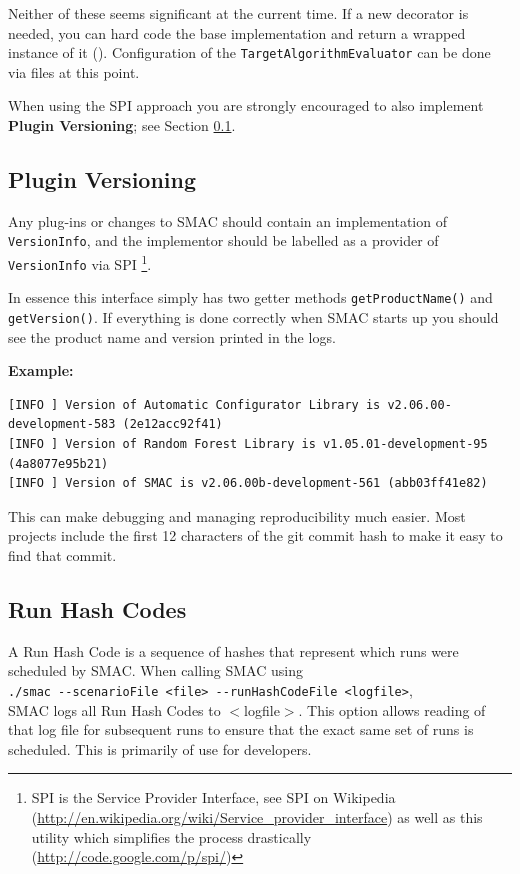 \documentclass[manual.tex]{subfiles}
\begin{document}
Neither of these seems significant at the current time. If a new decorator is needed, you can hard code the base implementation and return a wrapped instance of it (). Configuration of the \texttt{TargetAlgorithmEvaluator} can be done via files at this point.

When using the SPI approach you are strongly encouraged to also implement \textbf{Plugin Versioning}; see Section \ref{sec:plugin-versioning}.


\subsection{Plugin Versioning}
\label{sec:plugin-versioning}

Any plug-ins or changes to SMAC should contain an implementation of \texttt{VersionInfo}, and 
the implementor should be labelled as a provider of \texttt{VersionInfo} via SPI \footnote{SPI is the Service Provider Interface, see SPI on Wikipedia (\url{http://en.wikipedia.org/wiki/Service_provider_interface}) as well as this utility which simplifies the process drastically (\url{http://code.google.com/p/spi/})}.

In essence this interface simply has two getter methods \texttt{getProductName()} and \texttt{getVersion()}. If everything is done correctly when SMAC starts up you should 
see the product name and version printed in the logs.

\textbf{Example:}
\small
\begin{verbatim}
[INFO ] Version of Automatic Configurator Library is v2.06.00-development-583 (2e12acc92f41) 
[INFO ] Version of Random Forest Library is v1.05.01-development-95 (4a8077e95b21) 
[INFO ] Version of SMAC is v2.06.00b-development-561 (abb03ff41e82) 
\end{verbatim}
\normalsize 
	This can make debugging and managing reproducibility much easier. Most projects include the first 12 characters of the git commit hash to make it easy to find that commit.
	
	
\subsection{Run Hash Codes}

A Run Hash Code is a sequence of hashes that represent which runs
were scheduled by SMAC. 
When calling SMAC using\\
\texttt{./smac~-{}-scenarioFile~<file>~-{}-runHashCodeFile~<logfile>},\\
SMAC logs all Run Hash Codes to $<$logfile$>$.
This option allows reading of that log file for subsequent runs to ensure that the exact same set of runs is scheduled. This is primarily of use for developers.

	
\end{document}
